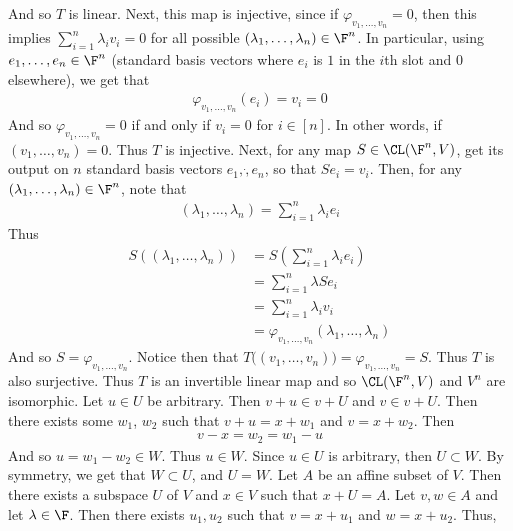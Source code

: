 \documentclass{book}
\begin{document}
\begin{enumerate}[label=\arabic*)]
      And so $T$ is linear. Next, this map is injective, since if $\varphi_{v_1, \dots, v_n} = 0$, then this implies $\sum_{i = 1}^{n}\lambda_iv_i = 0$ for all possible $(\lambda_1, \dots,
      \lambda_n) \in \F^n$. In particular, using $e_1, \dots, e_n \in \F^n$ (standard basis vectors where $e_i$ is $1$ in the $i$th slot and $0$ elsewhere), we get that
      \begin{align*}
        \varphi_{v_1, \dots, v_n}(e_i) = v_i = 0
      \end{align*}
      And so $\varphi_{v_1, \dots, v_n} = 0$ if and only if $v_i = 0$ for $i \in [n]$. In other words, if $(v_1, \dots, v_n) = 0$. Thus $T$ is injective. Next, for any map $S \in \CL(\F^n,
      V)$, get its output on $n$ standard basis vectors $e_1, \dot, e_n$, so that $Se_i = v_i$. Then, for any $(\lambda_1, \dots, \lambda_n) \in \F^n$, note that
      \begin{align*}
        (\lambda_1, \dots, \lambda_n) = \sum_{i = 1}^{n}\lambda_ie_i
      \end{align*}
      Thus
      \begin{align*}
        S\left((\lambda_1, \dots, \lambda_n)\right) & = S(\sum_{i = 1}^{n}\lambda_ie_i) \\
        & = \sum_{i = 1}^{n}\lambda Se_i \\
        & = \sum_{i = 1}^{n}\lambda_iv_i \\
        & = \varphi_{v_1, \dots, v_n}(\lambda_1, \dots, \lambda_n)
      \end{align*}
      And so $S = \varphi_{v_1, \dots, v_n}$. Notice then that $T\big((v_1, \dots, v_n)\big) = \varphi_{v_1, \dots, v_n} = S$. Thus $T$ is also surjective. Thus $T$ is an invertible linear
      map and so $\CL(\F^n, V)$ and $V^n$ are isomorphic.
    \ii
      Let $u \in U$ be arbitrary. Then $v + u \in v + U$ and $v \in v + U$. Then there exists some $w_1$, $w_2$ such that $v + u = x + w_1$ and $v = x + w_2$. Then
      \begin{align*}
        v - x = w_2 = w_1 - u
      \end{align*}
      And so $u = w_1 - w_2 \in W$. Thus $u \in W$. Since $u \in U$ is arbitrary, then $U \subset W$. By symmetry, we get that $W \subset U$, and $U = W$.
    \ii
      Let $A$ be an affine subset of $V$. Then there exists a subspace $U$ of $V$ and $x \in V$ such that $x + U = A$. Let $v, w \in A$ and let $\lambda \in \F$. Then there exists $u_1, u_2$
      such that $v = x + u_1$ and $w = x + u_2$. Thus, 
      \begin{align*}

\end{align*}
\end{enumerate}
\end{document}
